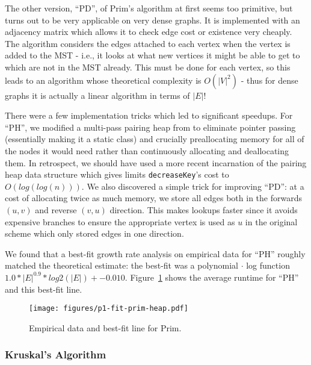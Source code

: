 The other version, ``PD'', of Prim's algorithm at first seems too primitive, but
turns out to be very applicable on very dense graphs.  It is implemented with an
adjacency matrix which allows it to check edge cost or existence very cheaply.
The algorithm considers the edges attached to each vertex when the vertex is
added to the MST - i.e., it looks at what new vertices it might be able to get
to which are not in the MST already.  This must be done for each vertex, so this
leads to an algorithm whose theoretical complexity is $O(|V|^2)$ - thus for
dense graphs it is actually a linear algorithm in terms of $|E|$!

There were a few implementation tricks which led to significant speedups.  For
``PH'', we modified a multi-pass pairing heap from \cite{rui} to eliminate
pointer passing (essentially making it a static class) and crucially
preallocating memory for all of the nodes it would need rather than continuously
allocating and deallocating them.  In retrospect, we should have used a more
recent incarnation of the pairing heap data structure which gives limits
\texttt{decreaseKey}'s cost to $O(log(log(n)))$\cite{elmasry}.  We also
discovered a simple trick for improving ``PD'': at a cost of allocating twice as
much memory, we store all edges both in the forwards $(u, v)$ and reverse $(v,
u)$ direction.  This makes lookups faster since it avoids expensive branches to
ensure the appropriate vertex is used as $u$ in the original scheme which only
stored edges in one direction.

We found that a best-fit growth rate analysis on empirical data for ``PH''
roughly matched the theoretical estimate: the best-fit was a polynomial $\cdot$
log function $1.0 * |E|^0.9 * log2(|E|) + -0.010$.
Figure~\ref{fig:p1-fit-prim-heap} shows the average runtime for ``PH'' and this
best-fit line.

\begin{figure}[htb]
\centering
\texttt{[image: figures/p1-fit-prim-heap.pdf]}
\caption{Empirical data and best-fit line for Prim.}
\label{fig:p1-fit-prim-heap}
\end{figure}

\subsubsection{Kruskal's Algorithm}

